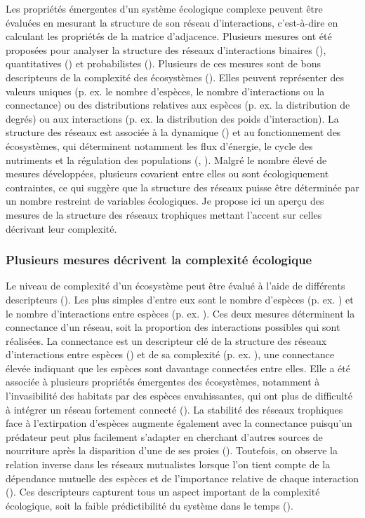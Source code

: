 Les propriétés émergentes d'un système écologique complexe peuvent être évaluées
en mesurant la structure de son réseau d'interactions, c'est-à-dire en calculant
les propriétés de la matrice d'adjacence. Plusieurs mesures ont été proposées
pour analyser la structure des réseaux d'interactions binaires
(\cite{Delmas2019Analysing}), quantitatives (\cite{Bersier2002Quantitative}) et
probabilistes (\cite{Poisot2016Structure}). Plusieurs de ces mesures sont de
bons descripteurs de la complexité des écosystèmes (\cite{Landi2018Complexity}).
Elles peuvent représenter des valeurs uniques (p. ex. le nombre d'espèces, le
nombre d'interactions ou la connectance) ou des distributions relatives aux
espèces (p. ex. la distribution de degrés) ou aux interactions (p. ex. la
distribution des poids d'interaction). La structure des réseaux est associée à
la dynamique (\cite{Pascual2006Ecological}) et au fonctionnement des
écosystèmes, qui déterminent notamment les flux d'énergie, le cycle des
nutriments et la régulation des populations (\cite{McCann2011Food},
\cite{Thompson2012Food}). Malgré le nombre élevé de mesures développées,
plusieurs covarient entre elles ou sont écologiquement contraintes, ce qui
suggère que la structure des réseaux puisse être déterminée par un nombre
restreint de variables écologiques. Je propose ici un aperçu des mesures de la
structure des réseaux trophiques mettant l'accent sur celles décrivant leur
complexité. 

\subsubsection{Plusieurs mesures décrivent la complexité écologique} 

Le niveau de complexité d'un écosystème peut être évalué à l'aide de différents
descripteurs (\cite{Landi2018Complexity}). Les plus simples d'entre eux sont le
nombre d'espèces (p. ex. \cite{May1972Will}) et le nombre d'interactions entre
espèces (p. ex. \cite{Okuyama2008Network}). Ces deux mesures déterminent la
connectance d'un réseau, soit la proportion des interactions possibles qui sont
réalisées. La connectance est un descripteur clé de la structure des réseaux
d'interactions entre espèces (\cite{Martinez1992Constant}) et de sa complexité
(p. ex. \cite{Rozdilsky2001Complexity}), une connectance élevée indiquant que
les espèces sont davantage connectées entre elles. Elle a été associée à
plusieurs propriétés émergentes des écosystèmes, notamment à l'invasibilité des
habitats par des espèces envahissantes, qui ont plus de difficulté à intégrer un
réseau fortement connecté (\cite{Smith-Ramesh2017Global}). La stabilité des
réseaux trophiques face à l'extirpation d'espèces augmente également avec la
connectance puisqu'un prédateur peut plus facilement s'adapter en cherchant
d'autres sources de nourriture après la disparition d'une de ses proies
(\cite{Dunne2002Network}). Toutefois, on observe la relation inverse dans les
réseaux mutualistes lorsque l'on tient compte de la dépendance mutuelle des
espèces et de l'importance relative de chaque interaction
(\cite{Vieira2015Simple}). Ces descripteurs capturent tous un aspect important
de la complexité écologique, soit la faible prédictibilité du système dans le
temps (\cite{Strydom2021Svd}). 


